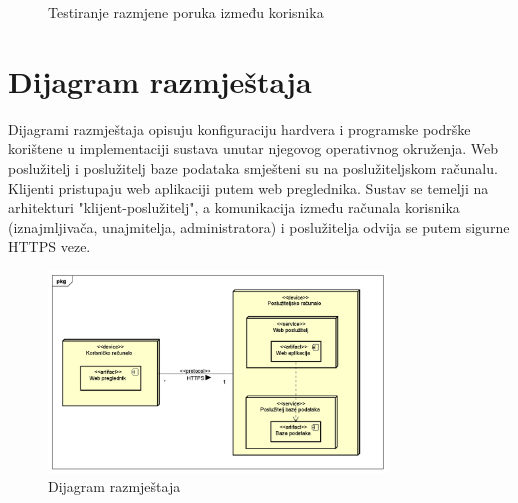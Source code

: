 			 \begin{figure}
			 	\centering
			 	\caption{Testiranje razmjene poruka između korisnika}
			 	\label{fig:Testiranje razmjene poruka između korisnika}
			 \end{figure}
			 
		
		\newpage
		
		\section{Dijagram razmještaja}
			
			 \indent Dijagrami razmještaja opisuju konfiguraciju hardvera i programske podrške korištene u implementaciji sustava unutar njegovog operativnog okruženja. Web poslužitelj i poslužitelj baze podataka smješteni su na poslužiteljskom računalu. Klijenti pristupaju web aplikaciji putem web preglednika. Sustav se temelji na arhitekturi "klijent-poslužitelj", a komunikacija između računala korisnika (iznajmljivača, unajmitelja, administratora) i poslužitelja odvija se putem sigurne HTTPS veze.
			
             \begin{figure}[H]
                \centering
                \includegraphics[width=0.8\textwidth]{dijagrami/Dijagram_razmjestaja.png}
				\caption{Dijagram razmještaja}
				\label{fig:your_label}
             \end{figure}

